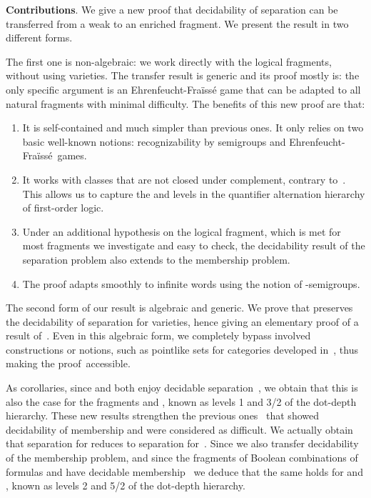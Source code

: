 \documentclass[a4paper,USenglish]{lipics}
\newcommand{\efgame}{Ehrenfeucht-Fra\"iss\'e\xspace}
\newcommand\highlight[1]{\par\bigskip\noindent\textbf{\sffamily #1}.}
\theoremstyle{plain}
\begin{document}
\highlight{Contributions} We give a new
proof that decidability of separation can be transferred from a weak to an
enriched fragment. We present the result in two different forms.

The first one is non-algebraic: we work directly with the logical fragments,
without using varieties. The transfer result is generic and its proof mostly
is: the only specific argument is an \efgame game that can be adapted
to all natural fragments with minimal difficulty. The
benefits of this new proof are that:
\begin{enumerate}
\item It is self-contained and much simpler than
  previous ones. It only relies on two basic well-known notions:
  recognizability by semigroups and \efgame~games.
\item It works with classes that are not closed under complement, contrary
  to~\cite{Steinberg:delay-pointlikes:2001}. This allows us to capture the
   and  levels in the quantifier alternation hierarchy of
  first-order logic.
\item Under an additional hypothesis on the logical fragment, which is met for
  most fragments we investigate and easy to check, the decidability result of
  the separation problem also extends to the membership problem.
\item The proof adapts smoothly to infinite words using
  the notion of -semigroups.
\end{enumerate}

The second form of our result is algebraic and generic. We prove that
 preserves the decidability of
separation for varieties, hence giving an elementary proof of a result
of~\cite{Steinberg:delay-pointlikes:2001}. Even in this algebraic form, we
completely bypass involved constructions or notions, such as pointlike sets
for categories developed in~\cite{Steinberg:delay-pointlikes:2001}, thus
making the proof~accessible.

As corollaries, since  and  both enjoy decidable
separation~\cite{sep_icalp13,DBLP:conf/mfcs/PlaceRZ13,PZ:icalp14}, we obtain
that this is also the case for the fragments  and  , known as
levels 1 and 3/2 of the dot-depth hierarchy. These new results strengthen the
previous ones~\cite{Knast:dd1:1983a,glasser-dd3/2} that showed
decidability of membership and were considered as difficult.
We actually obtain that separation for  reduces to separation for~.
Since we also transfer decidability of the membership problem, and
since  the fragments  of Boolean combinations of 
formulas and  have decidable membership~\cite{PZ:icalp14} we deduce
that the same holds for  and , known as levels 2 and 5/2 of
the dot-depth hierarchy.
\end{document}

